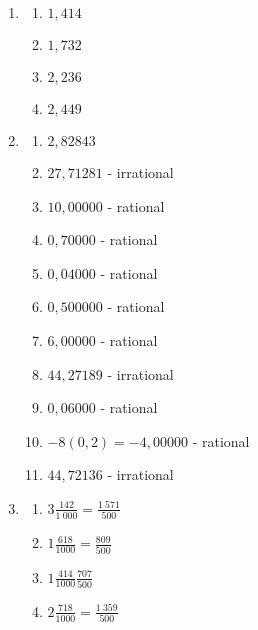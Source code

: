 \begin{eocsolutions}{}
{\begin{enumerate}[itemsep=6pt, label=\textbf{\arabic*}. ]
\item %
\begin{multicols}{2}
    \begin{enumerate}[noitemsep, label=\textbf{(\alph*)} ] 
    \item $1,414$ %
    \item $1,732$%
    \item $2,236$%
    \item $2,449$%
    \end{enumerate}
\end{multicols}
% 
\item %
\begin{multicols}{2}
    \begin{enumerate}[noitemsep, label=\textbf{(\alph*)} ] 
    \item $2,82843$%
    \item $27,71281$ - irrational %
    \item $10,00000$ - rational 
    \item $0,70000$ - rational  %
    \item $0,04000$ - rational %
    \item $0,500000$ - rational  %
    \item $6,00000$ - rational  %
    \item $44,27189$ - irrational  %
    \item $0,06000$ - rational%
    \item $-8(0,2) = -4,00000$ - rational  %
    \item $44,72136$ - irrational %
    \end{enumerate}
\end{multicols}
\item %
\begin{multicols}{2}
\begin{enumerate}[noitemsep, label=\textbf{(\alph*)} ] 
\item $3 \frac{142}{1~000} =\frac{1~571}{500}$
\item $1\frac{618}{1000}=\frac{809}{500}$
\item $1\frac{414}{1000}\frac{707}{500}$
\item $2\frac{718}{1000}=\frac{1~359}{500}$
    \end{enumerate}
\end{multicols}


\end{enumerate}}
\end{eocsolutions}
